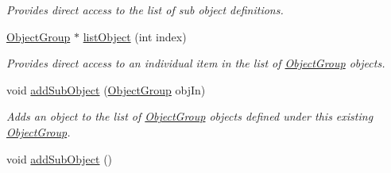 \begin{DoxyCompactItemize}
\begin{DoxyCompactList}\small\item\em Provides direct access to the list of sub object definitions. \end{DoxyCompactList}\item 
\hyperlink{class_object_group}{Object\-Group} $\ast$ \hyperlink{class_object_group_a0a080e78f85ad74d3920d8d4d2896ff4}{list\-Object} (int index)
\begin{DoxyCompactList}\small\item\em Provides direct access to an individual item in the list of \hyperlink{class_object_group}{Object\-Group} objects. \end{DoxyCompactList}\item 
void \hyperlink{class_object_group_ab705c0409d674106c28518368e5108ad}{add\-Sub\-Object} (\hyperlink{class_object_group}{Object\-Group} obj\-In)
\begin{DoxyCompactList}\small\item\em Adds an object to the list of \hyperlink{class_object_group}{Object\-Group} objects defined under this existing \hyperlink{class_object_group}{Object\-Group}. \end{DoxyCompactList}\item 
\hypertarget{class_object_group_a71804670b83abe0c161f5fdebc598373}{void \hyperlink{class_object_group_a71804670b83abe0c161f5fdebc598373}{add\-Sub\-Object} ()}\label{class_object_group_a71804670b83abe0c161f5fdebc598373}


\end{DoxyCompactItemize}
